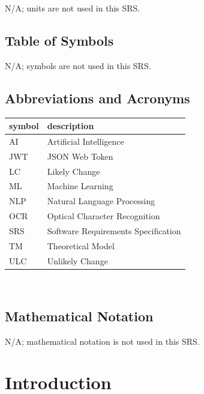 \documentclass[12pt]{article}
\begin{document}
N/A; units are not used in this SRS.

\subsection{Table of Symbols}

N/A; symbols are not used in this SRS.

\subsection{Abbreviations and Acronyms}

\renewcommand{\arraystretch}{1.2}
\begin{tabular}{l l} 
  \toprule		
  \textbf{symbol} & \textbf{description}\\
  \midrule 
  AI & Artificial Intelligence\\
  JWT & JSON Web Token\\
  LC & Likely Change\\
  ML & Machine Learning\\
  NLP & Natural Language Processing\\
  OCR & Optical Character Recognition\\
  SRS & Software Requirements Specification\\
  TM & Theoretical Model\\
  ULC & Unlikely Change\\
  \bottomrule
\end{tabular}\\

\subsection{Mathematical Notation}

N/A; mathematical notation is not used in this SRS.

\newpage


\section{Introduction}

\end{document}
